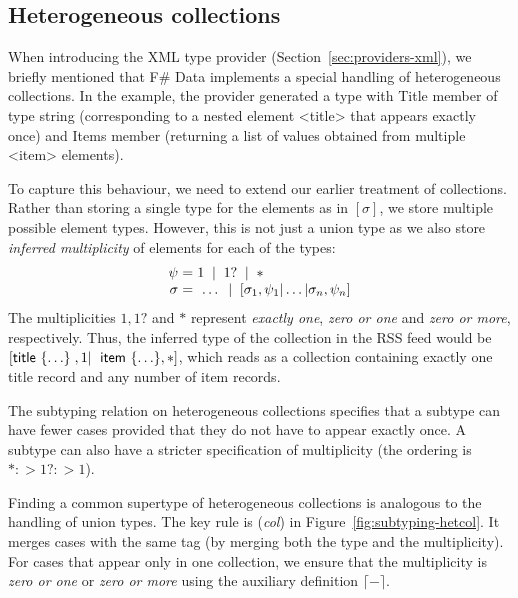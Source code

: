 \documentclass[10pt,preprint,blind,clearpagebib]{sigplanconf}
\newcommand{\ident}[1]{\textnormal{\sffamily #1}}
\newcommand{\lsep}[0]{\;\; | \;\;}
\newcommand{\narrow}[1]{\hspace{-0.7em} #1 \hspace{-0.7em}}
\newcommand{\addopt}[1]{\lceil#1\rceil}
\begin{document}

\subsection{Heterogeneous collections}
\label{sec:impl-collections}

When introducing the XML type provider (Section~\ref{sec:providers-xml}), we briefly mentioned 
that F\# Data implements a special handling of heterogeneous collections. In the example, the provider
generated a type with \ident{Title} member of type \ident{string} (corresponding to a nested element
{\ttfamily\small <title>} that appears exactly once) and \ident{Items} member (returning a list of
values obtained from multiple {\ttfamily\small <item>} elements).

To capture this behaviour, we need to extend our earlier treatment of collections. Rather than storing
a single type for the elements as in $[\sigma]$, we store multiple possible element types. However,
this is not just a union type as we also store \emph{inferred multiplicity} of elements for 
each of the types:
%
\begin{equation*}
\begin{array}{rcl}
 \psi &\narrow{=}& 1 \lsep 1? \lsep \ast \\
 \sigma &\narrow{=}& ~\ldots \lsep [\sigma_1, \psi_1 | \ldots | \sigma_n, \psi_n ]
\end{array}
\end{equation*}
%
The multiplicities $1, 1?$ and $\ast$ represent \emph{exactly one}, \emph{zero or one} and \emph{zero or more},
respectively. Thus, the inferred type of the collection in the RSS feed would be
$[\ident{title}~\{ \ldots \}\;,1|\;\ident{item}~\{ \ldots \},\ast]$, which reads as a collection
containing exactly one \ident{title} record and any number of \ident{item} records.

The subtyping relation on heterogeneous collections specifies that a subtype can have fewer cases 
provided that they do not have to appear exactly once. A subtype can also have a stricter specification
of multiplicity (the ordering is $\ast :> 1? :> 1$). 

Finding a common supertype of heterogeneous collections is analogous to the handling of union types.
The key rule is (\emph{col}) in Figure~\ref{fig:subtyping-hetcol}. It merges cases with the same tag
(by merging both the type and the multiplicity). For cases that appear only in one collection, we ensure
that the multiplicity is \emph{zero or one} or \emph{zero or more} using the auxiliary definition
$\addopt{-}$.
\end{document}
